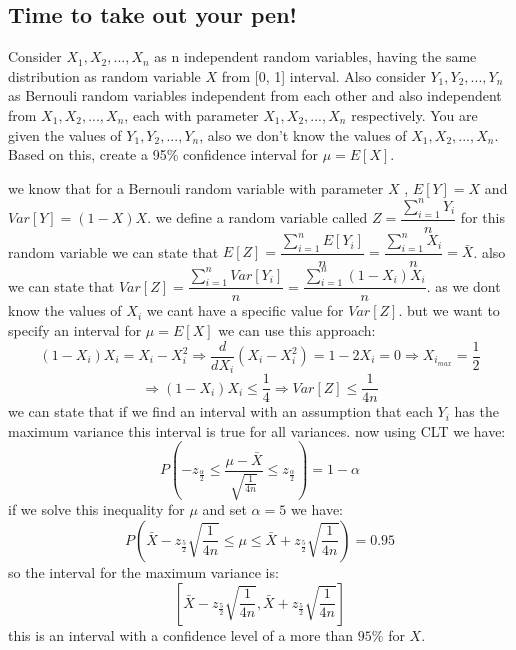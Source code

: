 \subsection{Time to take out your pen!}
Consider $X_1, X_2, . . . , X_n$ as n independent random variables, having the same distribution as
random variable $X$ from [0, 1] interval. Also consider $Y_1, Y_2, . . . , Y_n$ as Bernouli random variables
independent from each other and also independent from $X_1, X_2, . . . , X_n$, each with parameter
$X_1, X_2, . . . , X_n$ respectively. You are given the values of $Y_1, Y_2, . . . , Y_n$, also we don’t know the
values of $X_1, X_2, . . . , X_n$. Based on this, create a 95\% confidence interval for $\mu = E[X]$.
\begin{qsolve}
	\begin{qsolve}[]
		we know that for a Bernouli random variable with parameter $X$ , $E[Y] = X$ and $Var[Y] = (1-X)X$. we define a random variable called $Z = \dfrac{\sum_{i = 1}^{n} Y_i}{n}$ for this random variable we can state that $E[Z] = \dfrac{\sum_{i = 1}^{n} E[Y_i]}{n} = \dfrac{\sum_{i = 1}^{n} X_i}{n} = \bar{X}$. also we can state that $Var[Z] = \dfrac{\sum_{i = 1}^{n} Var[Y_i]}{n} = \dfrac{\sum_{i = 1}^{n} (1-X_i)X_i}{n}$.
		\splitqsolve[\splitqsolve]
		as we dont know the values of $X_i$ we cant have a specific value for $Var[Z]$. but we want to specify an interval for $\mu = E[X]$ we can use this approach:
		$$(1-X_i)X_i = X_i - X_i^2 \Rightarrow \frac{d}{dX_i} (X_i - X_i^2) = 1 - 2X_i = 0 \Rightarrow X_{i_{max}} = \frac{1}{2}$$
		$$\Rightarrow (1-X_i)X_i \leq \frac{1}{4} \Rightarrow Var[Z] \leq \frac{1}{4n}$$
		we can state that if we find an interval with an assumption that each $Y_i$ has the maximum variance this interval is true for all variances. now using CLT we have:
		$$P(-z_{\frac{\alpha}{2}}\leq \dfrac{\mu - \bar{X}}{\sqrt{\frac{1}{4n}}} \leq z_{\frac{\alpha}{2}}) = 1-\alpha$$
		if we solve this inequality for $\mu$ and set $\alpha = 5$ we have:
		$$P(\bar{X} - z_{\frac{5}{2}}\sqrt{\frac{1}{4n}} \leq \mu \leq \bar{X} + z_{\frac{5}{2}}\sqrt{\frac{1}{4n}}) = 0.95$$
		so the interval for the maximum variance is:
		$$[\bar{X} - z_{\frac{5}{2}}\sqrt{\frac{1}{4n}}, \bar{X} + z_{\frac{5}{2}}\sqrt{\frac{1}{4n}}]$$
		this is an interval with a confidence level of a more than $95\%$ for $X$.
	\end{qsolve}
\end{qsolve}
